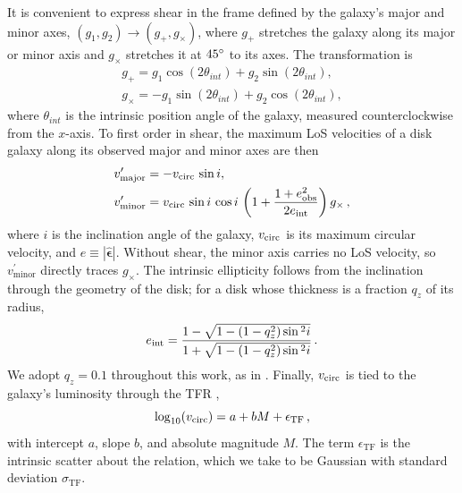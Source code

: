 It is convenient to express shear in the frame defined by the galaxy's major and minor axes, $(g_1, g_2) \rightarrow (g_+, g_\times)$, where $g_+$ stretches the galaxy along its major or minor axis and $g_\times$ stretches it at $45\degree$ to its axes. The transformation is
\begin{equation}
\label{eqn:shear-coords}
    \begin{aligned}
    g_+ = g_1\cos(2\theta_{int}) + g_2\sin(2\theta_{int}), \\
    g_\times = -g_1\sin(2\theta_{int}) + g_2\cos(2\theta_{int}),
    \end{aligned}
\end{equation}
where $\theta_{int}$ is the intrinsic position angle of the galaxy, measured counterclockwise from the $x$-axis. To first order in shear, the maximum LoS velocities of a disk galaxy along its observed major and minor axes are then
\begin{equation}
\label{eqn:v-measured}
    \begin{aligned}
    v^\prime_\mathrm{major}&=-v_\mathrm{circ}\,\sin{i},\\
    v^\prime_\mathrm{minor}&=
    v_\mathrm{circ}\,\sin{i}\,\cos{i}\,\left(1+\frac{1+e_\mathrm{obs}^2}{2e_{\mathrm{int}}}\right)g_\times\,,
    \end{aligned}
\end{equation}
where $i$ is the inclination angle of the galaxy, $v_\mathrm{circ}$ is its maximum circular velocity, and $e\equiv|\hat{\bm{\epsilon}}|$. Without shear, the minor axis carries no LoS velocity, so $v^\prime_\mathrm{minor}$ directly traces $g_\times$. The intrinsic ellipticity follows from the inclination through the geometry of the disk; for a disk whose thickness is a fraction $q_z$ of its radius,
\begin{equation}
\label{eqn:eint-geo}
    e_{\mathrm{int}}=\frac{1-\sqrt{1-(1-q_z^2)\sin{^2i}}}{1+\sqrt{1-(1-q_z^2)\sin{^2i}}}\,.
\end{equation}
We adopt $q_z=0.1$ throughout this work, as in \citep{KLDESI}. Finally, $v_\mathrm{circ}$ is tied to the galaxy's luminosity through the TFR \citep{TFR},
\begin{equation}
\label{eqn:TFR}
    \log_\mathrm{10}(v_\mathrm{circ})=a + bM+\epsilon_\mathrm{TF}\,,
\end{equation}
with intercept $a$, slope $b$, and absolute magnitude $M$. The term $\epsilon_\mathrm{TF}$ is the intrinsic scatter about the relation, which we take to be Gaussian with standard deviation $\sigma_\mathrm{TF}$.

